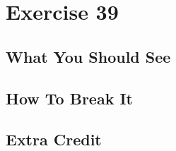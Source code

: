 \chapter{Exercise 39}


\section{What You Should See}


\section{How To Break It}


\section{Extra Credit}



